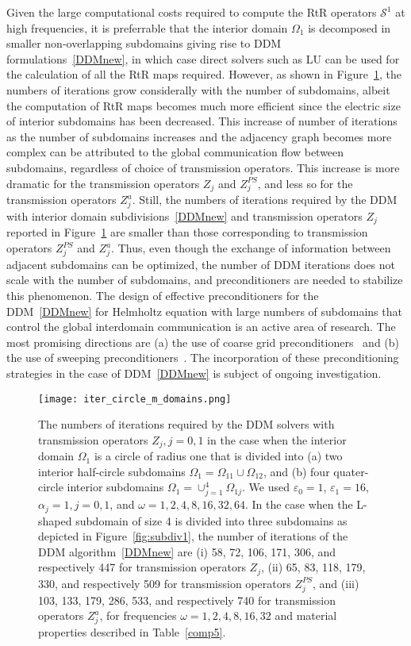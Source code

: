 \documentclass[11pt]{article}
\numberwithin{equation}{section}
\begin{document}
Given the large computational costs required to compute the RtR operators $\mathcal{S}^1$ at high frequencies, it is preferrable that the interior domain $\Omega_1$ is decomposed in smaller non-overlapping subdomains giving rise to DDM formulations~\eqref{DDMnew}, in which case direct solvers such as LU can be used for the calculation of all the RtR maps required.  However, as shown in Figure~\ref{fig:iter_circle_subdomains}, the numbers of iterations grow considerally with the number of subdomains, albeit the computation of RtR maps becomes much more efficient since the electric size of interior subdomains has been decreased. This increase of number of iterations as the number of subdomains increases and the adjacency graph becomes more complex can be attributed to the global communication flow between subdomains, regardless of choice of transmission operators. This increase is more dramatic for the transmission operators $Z_j$ and $Z_j^{PS}$, and less so for the transmission operators $Z_j^a$. Still, the numbers of iterations required by the DDM with interior domain subdivisions~\eqref{DDMnew} and transmission operators $Z_j$ reported in Figure~\ref{fig:iter_circle_subdomains} are smaller than those corresponding to transmission operators $Z_j^{PS}$ and $Z_j^a$. Thus, even though the exchange of information between adjacent subdomains can be optimized, the number of DDM iterations does not scale with the number of subdomains, and preconditioners are needed to stabilize this phenomenon. The design of effective preconditioners for the DDM~\eqref{DDMnew} for Helmholtz equation with large numbers of subdomains that control the global interdomain communication is an active area of research. The most promising directions are (a) the use of coarse grid preconditioners~\cite{stolk2013rapidly,conen2014coarse} and (b) the use of  sweeping preconditioners~\cite{vion2014double}. The incorporation of these preconditioning strategies in the case of DDM~\eqref{DDMnew} is subject of ongoing investigation.

\begin{figure}
\centering
\texttt{[image: iter\_circle\_m\_domains.png]}
\caption{The numbers of iterations required by the DDM solvers with transmission operators $Z_j,j=0,1$ in the case when the interior domain $\Omega_1$ is a circle of radius one that is divided into (a) two interior half-circle subdomains $\Omega_1=\Omega_{11}\cup\Omega_{12}$, and (b) four quater-circle interior subdomains $\Omega_1=\cup_{j=1}^4 \Omega_{1j}$. We used $\varepsilon_0=1$, $\varepsilon_1=16$, $\alpha_j=1,j=0,1$, and $\omega=1,2,4,8,16,32,64$. In the case when the L-shaped subdomain of size 4 is divided into three subdomains as depicted in Figure~\ref{fig:subdiv1}, the number of iterations of the DDM algorithm~\eqref{DDMnew} are (i) 58, 72, 106, 171, 306, and respectively 447 for transmission operators $Z_j$, (ii) 65, 83, 118, 179, 330, and respectively 509 for transmission operators $Z_j^{PS}$, and (iii) 103, 133, 179, 286, 533, and respectively 740 for transmission operators $Z_j^a$, for frequencies $\omega=1,2,4,8,16,32$ and material properties described in Table~\ref{comp5}. }
\label{fig:iter_circle_subdomains}
\end{figure}
\end{document}
